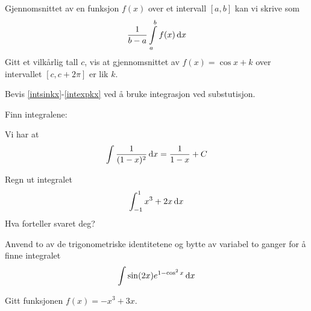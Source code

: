 Gjennomsnittet av en funksjon $ f(x) $ over et intervall $ [a, b] $ kan vi skrive som
\[ \frac{1}{b-a}\int\limits_a^b f(x)\,\text{d}x \]
Gitt et vilkårlig tall $ c $, vis at gjennomsnittet av $f(x)=\cos x+k  $ over intervallet $ [c, c+2\pi] $ er lik $ k $. 

\vs
{}

Bevis \eqref{intsinkx}-\eqref{intexpkx} ved å bruke integrasjon ved substutisjon.

Finn integralene:\os
{} \os
{} \os
{} \os
{}


Vi har at
\[ \int \frac{1}{(1-x)^2}\,\text{d}x=\frac{1}{1-x}+C \]

Regn ut integralet
\[ \int_{-1}^{1}x^3+2x\,\text{d}x \]
Hva forteller svaret deg?

Anvend to av de trigonometriske identitetene og bytte av variabel to ganger for å finne integralet
\[ \int \sin (2x) e^{1-\cos^2 x}\,\text{d}x \]\vs


Gitt funksjonen $f(x)=-x^3+3x$.


